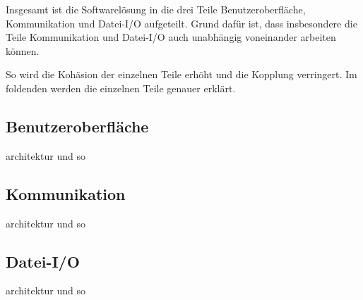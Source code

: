 Insgesamt ist die Softwarelösung in die drei Teile Benutzeroberfläche, Kommunikation und Datei-I/O aufgeteilt. Grund dafür ist, dass insbesondere die Teile Kommunikation und Datei-I/O auch unabhängig voneinander arbeiten können.

So wird die Kohäsion der einzelnen Teile erhöht und die Kopplung verringert. Im foldenden werden die einzelnen Teile genauer erklärt.

\subsection{Benutzeroberfläche}
architektur und so

\subsection{Kommunikation}
architektur und so

\subsection*{Datei-I/O}
architektur und so
